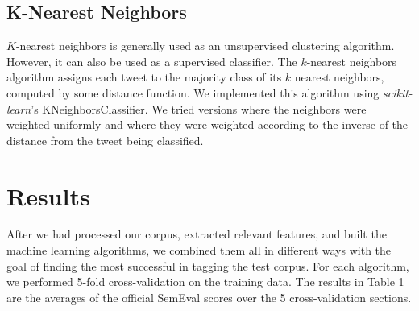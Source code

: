 \documentclass[11pt,letterpaper]{article}
\begin{document}
\subsection{K-Nearest Neighbors}
$K$-nearest neighbors is generally used as an unsupervised clustering algorithm. However, it can also be used as a supervised classifier. The $k$-nearest neighbors algorithm assigns each tweet to the majority class of its $k$ nearest neighbors, computed by some distance function. We implemented this algorithm using \textit{scikit-learn}'s KNeighborsClassifier. We tried versions where the neighbors were weighted uniformly and where they were weighted according to the inverse of the distance from the tweet being classified.

\section{Results}
After we had processed our corpus, extracted relevant features, and built the machine learning algorithms, we combined them all in different ways with the goal of finding the most successful in tagging the test corpus. For each algorithm, we performed 5-fold cross-validation on the training data. The results in Table 1 are the averages of the official SemEval scores over the 5 cross-validation sections.
\end{document}
